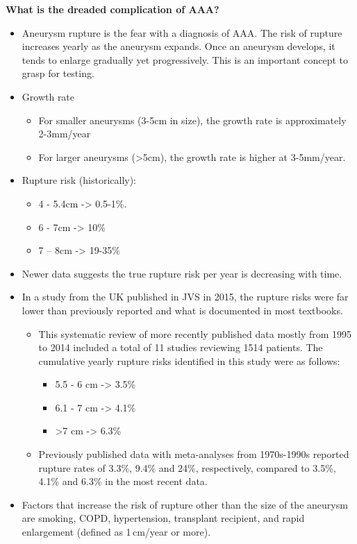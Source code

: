 \documentclass[
]{book}
\begin{document}
\textbf{What is the dreaded complication of AAA?}
\citep{mooreVascularEndovascularSurgery2019}

\begin{itemize}
\item
  Aneurysm rupture is the fear with a diagnosis of AAA. The risk of
  rupture increases yearly as the aneurysm expands. Once an aneurysm
  develops, it tends to enlarge gradually yet progressively. This is
  an important concept to grasp for testing.
\item
  Growth rate

  \begin{itemize}
  \item
    For smaller aneurysms (3-5cm in size), the growth rate is
    approximately 2-3mm/year
  \item
    For larger aneurysms (\textgreater5cm), the growth rate is higher at
    3-5mm/year.
  \end{itemize}
\item
  Rupture risk (historically):

  \begin{itemize}
  \item
    4 - 5.4cm -\textgreater{} 0.5-1\%.
  \item
    6 - 7cm -\textgreater{} 10\%
  \item
    7 -- 8cm -\textgreater{} 19-35\%
  \end{itemize}
\item
  Newer data suggests the true rupture risk per year is decreasing
  with time.
\item
  In a study from the UK published in JVS in 2015, the rupture risks
  were far lower than previously reported and what is documented in
  most textbooks. \citep{parkinsonRuptureRatesUntreated2015}

  \begin{itemize}
  \item
    This systematic review of more recently published data mostly
    from 1995 to 2014 included a total of 11 studies reviewing 1514
    patients. The cumulative yearly rupture risks identified in this
    study were as follows:

    \begin{itemize}
    \item
      5.5 - 6 cm -\textgreater{} 3.5\%
    \item
      6.1 - 7 cm -\textgreater{} 4.1\%
    \item
      \textgreater7 cm -\textgreater{} 6.3\%
    \end{itemize}
  \item
    Previously published data with meta-analyses from 1970s-1990s
    reported rupture rates of 3.3\%, 9.4\% and 24\%, respectively,
    compared to 3.5\%, 4.1\% and 6.3\% in the most recent data.
  \end{itemize}
\item
  Factors that increase the risk of rupture other than the size of the
  aneurysm are smoking, COPD, hypertension, transplant recipient, and
  rapid enlargement (defined as 1\,cm/year or more).
\end{itemize}
\end{document}

